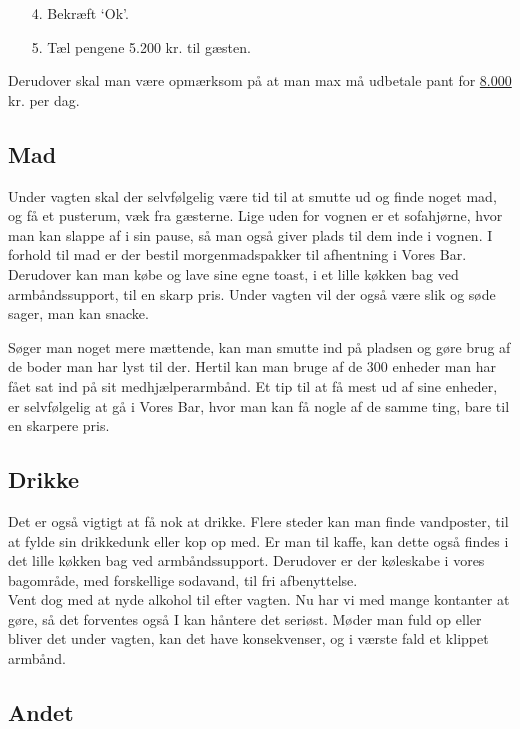 \begin{enumerate}
  \item[4.] Bekræft `Ok'.
  \item[5.] Tæl pengene 5.200 kr. til gæsten.
\end{enumerate}

Derudover skal man være opmærksom på at man max må udbetale pant for \underline{8.000} kr. per dag.

\subsection{Mad}

Under vagten skal der selvfølgelig være tid til at smutte ud og finde noget mad, og få et 
pusterum, væk fra gæsterne. Lige uden for vognen er et sofahjørne, hvor man kan slappe af i 
sin pause, så man også giver plads til dem inde i vognen.
I forhold til mad er der bestil morgenmadspakker til afhentning i Vores Bar. 
Derudover kan man købe og lave sine egne toast, i et lille køkken bag ved armbåndssupport, 
til en skarp pris. Under vagten vil der også være slik og søde sager, man kan snacke.

Søger man noget mere mættende, kan man smutte ind på pladsen og gøre brug af de boder man har lyst til der.
Hertil kan man bruge af de 300 enheder man har fået sat ind på sit medhjælperarmbånd. Et tip til at få mest 
ud af sine enheder, er selvfølgelig at gå i Vores Bar, hvor man kan få nogle af de samme ting, bare til en 
skarpere pris.

\subsection{Drikke}

Det er også vigtigt at få nok at drikke.
Flere steder kan man finde vandposter, til at fylde sin drikkedunk eller kop op med.
Er man til kaffe, kan dette også findes i det lille køkken bag ved armbåndssupport.
Derudover er der køleskabe i vores bagområde, med forskellige sodavand, til fri 
afbenyttelse. \\

Vent dog med at nyde alkohol til efter vagten. Nu har vi med mange kontanter at gøre, 
så det forventes også I kan håntere det seriøst. 
Møder man fuld op eller bliver det under vagten, kan det have konsekvenser, og i 
værste fald et klippet armbånd.

\subsection{Andet}
\label{sec:intra:andet}

